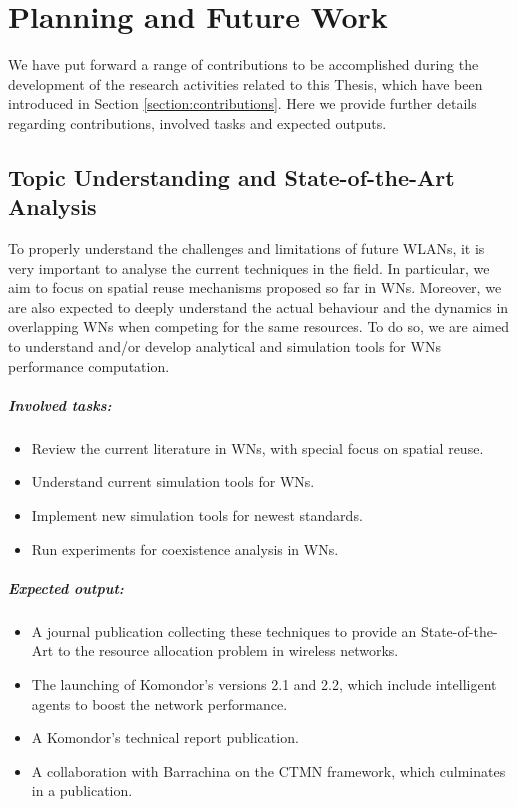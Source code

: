 \documentclass[12pt, a4paper,twoside]{tesi_upf}
\begin{document}
	\chapter{Planning and Future Work}
	\label{section:future_work}		
		We have put forward a range of contributions to be accomplished during the development of the research activities related to this Thesis, which have been introduced in Section \ref{section:contributions}. Here we provide further details regarding contributions, involved tasks and expected outputs.

		\section{Topic Understanding and State-of-the-Art Analysis}
		\label{section:contribution1}	
			To properly understand the challenges and limitations of future WLANs, it is very important to analyse the current techniques in the field. In particular, we aim to focus on spatial reuse mechanisms proposed so far in WNs. Moreover, we are also expected to deeply understand the actual behaviour and the dynamics in overlapping WNs when competing for the same resources. To do so, we are aimed to understand and/or develop analytical and simulation tools for WNs performance computation.	
							
			\paragraph{Involved tasks:}		
			\begin{itemize}
				\item Review the current literature in WNs, with special focus on spatial reuse.
				\item Understand current simulation tools for WNs.
				\item Implement new simulation tools for newest standards.
				\item Run experiments for coexistence analysis in WNs.			
			\end{itemize}	
		
			\paragraph{Expected output:}		
			\begin{itemize}
				\item A journal publication collecting these techniques to provide an State-of-the-Art to the resource allocation problem in wireless networks.
				\item The launching of Komondor's versions 2.1 and 2.2, which include intelligent agents to boost the network performance. 
				\item A Komondor's technical report publication.	
				\item A collaboration with Barrachina on the CTMN framework, which culminates in a publication.		
			\end{itemize}	
\end{document}
